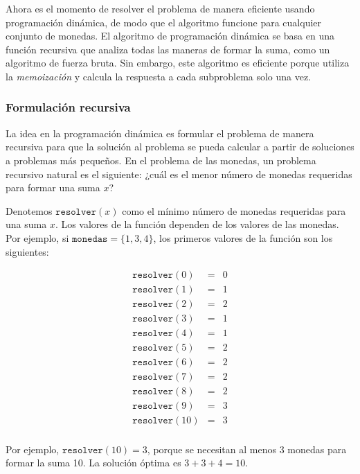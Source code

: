 Ahora es el momento de resolver el problema de manera eficiente
usando programación dinámica, de modo que el algoritmo
funcione para cualquier conjunto de monedas.
El algoritmo de programación dinámica
se basa en una función recursiva
que analiza todas las maneras de formar la suma,
como un algoritmo de fuerza bruta.
Sin embargo, este algoritmo es eficiente porque
utiliza la \emph{memoización} y
calcula la respuesta a cada subproblema solo una vez.

\subsubsection{Formulación recursiva}

La idea en la programación dinámica es
formular el problema de manera recursiva para que
la solución al problema se pueda
calcular a partir de soluciones a problemas
más pequeños.
En el problema de las monedas, un problema recursivo
natural es el siguiente:
¿cuál es el menor número de monedas
requeridas para formar una suma $x$?

Denotemos $\texttt{resolver}(x)$
como el mínimo
número de monedas requeridas para una suma $x$.
Los valores de la función dependen de los
valores de las monedas.
Por ejemplo, si $\texttt{monedas} = \{1,3,4\}$,
los primeros valores de la función son los siguientes:

\[
    \begin{array}{lcl}
        \texttt{resolver}(0)  & = & 0 \\
        \texttt{resolver}(1)  & = & 1 \\
        \texttt{resolver}(2)  & = & 2 \\
        \texttt{resolver}(3)  & = & 1 \\
        \texttt{resolver}(4)  & = & 1 \\
        \texttt{resolver}(5)  & = & 2 \\
        \texttt{resolver}(6)  & = & 2 \\
        \texttt{resolver}(7)  & = & 2 \\
        \texttt{resolver}(8)  & = & 2 \\
        \texttt{resolver}(9)  & = & 3 \\
        \texttt{resolver}(10) & = & 3 \\
    \end{array}
\]

Por ejemplo, $\texttt{resolver}(10)=3$,
porque se necesitan al menos 3 monedas
para formar la suma 10.
La solución óptima es $3+3+4=10$.


